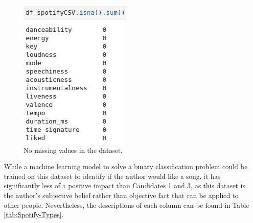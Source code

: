 \documentclass[12pt]{report}
\begin{document}
\begin{figure}[H]
    \centering
    \includegraphics[width=.4\linewidth]{pandas/Spotify-NA.png}
    \caption{No missing values in the dataset.}
    \label{fig:Spotify-NA}
\end{figure}

While a machine learning model to solve a binary classification problem could be trained on this dataset to identify if the author would like a song, 
it has significantly less of a positive impact than Candidates 1 and 3, as this dataset is the author's subjective belief rather than objective
fact that can be applied to other people. Nevertheless, the descriptions of each column can be found in Table \ref{tab:Spotify-Types}.
\end{document}
